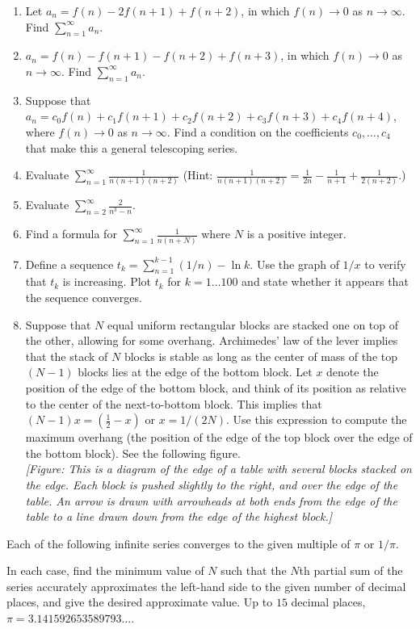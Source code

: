 \documentclass{exercises}
\begin{document}
\begin{enumerate}[resume]
\item Let $a_{n}=f(n)-2f(n+1)+f(n+2)$, in which $f(n)\to0$ as $n\to \infty$. Find $\sum_{n=1}^{\infty}a_{n}$.
\item $a_{n}=f(n)-f(n+1)-f(n+2)+f(n+3)$, in which $f(n)\to0$ as $n\to \infty$. Find $\sum_{n=1}^{\infty}a_{n}$.
\item Suppose that $a_{n}=c_{0}f(n)+c_{1}f(n+1)+c_{2}f(n+2)+c_{3}f(n+3)+c_{4}f(n+4)$, where $f(n)\to0$ as $n\to \infty$. Find a condition on the coefficients $c_{0},\ldots,c_{4}$ that make this a general telescoping series.
\item Evaluate $\sum_{n=1}^{\infty}\frac{1}{n(n+1)(n+2)}$ (Hint: $\frac{1}{n(n+1)(n+2)}=\frac{1}{2n}-\frac{1}{n+1}+\frac{1}{2(n+2)}$.)
\item Evaluate $\sum_{n=2}^{\infty}\frac{2}{n^{3}-n}$.
\item Find a formula for $\sum_{n=1}^{\infty}\frac{1}{n(n+N)}$ where $N$ is a positive integer.
\item \techrequired Define a sequence $t_{k}=\sum_{n=1}^{k-1}(1/n)-\ln k$. Use the graph of $1/x$ to verify that $t_{k}$ is increasing. Plot $t_{k}$ for $k=1\ldots100$ and state whether it appears that the sequence converges.
\item \techrequired Suppose that $N$ equal uniform rectangular blocks are stacked one on top of the other, allowing for some overhang. Archimedes' law of the lever implies that the stack of $N$ blocks is stable as long as the center of mass of the top $(N-1)$ blocks lies at the edge of the bottom block. Let $x$ denote the position of the edge of the bottom block, and think of its position as relative to the center of the next-to-bottom block. This implies that $(N-1)x=(\frac{1}{2}-x)$ or $x=1/(2N)$. Use this expression to compute the maximum overhang (the position of the edge of the top block over the edge of the bottom block). See the following figure. \\ \textit{[Figure: This is a diagram of the edge of a table with several blocks stacked on the edge. Each block is pushed slightly to the right, and over the edge of the table. An arrow is drawn with arrowheads at both ends from the edge of the table to a line drawn down from the edge of the highest block.]}
\end{enumerate}

Each of the following infinite series converges to the given multiple of $\pi$ or $1/\pi$.


In each case, find the minimum value of $N$ such that the $N$th partial sum of the series accurately approximates the left-hand side to the given number of decimal places, and give the desired approximate value. Up to $15$ decimal places, $\pi=3.141592653589793\ldots$.
\end{document}
